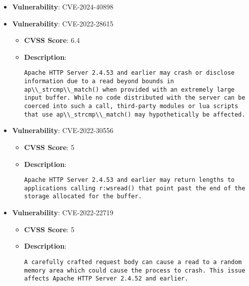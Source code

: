 \documentclass{article}
\begin{document}
\begin{itemize}
        \item \textbf{Vulnerability}: CVE-2024-40898
    
        \item \textbf{Vulnerability}: CVE-2022-28615
        \begin{itemize}
            \item \textbf{CVSS Score}:  6.4 
            \item \textbf{Description}:
            \parbox[t]{0.9\linewidth}{
                \verb|Apache HTTP Server 2.4.53 and earlier may crash or disclose information due to a read beyond bounds in ap\\_strcmp\\_match() when provided with an extremely large input buffer. While no code distributed with the server can be coerced into such a call, third-party modules or lua scripts that use ap\\_strcmp\\_match() may hypothetically be affected.|
            }
        \end{itemize}
    
        \item \textbf{Vulnerability}: CVE-2022-30556
        \begin{itemize}
            \item \textbf{CVSS Score}:  5 
            \item \textbf{Description}:
            \parbox[t]{0.9\linewidth}{
                \verb|Apache HTTP Server 2.4.53 and earlier may return lengths to applications calling r:wsread() that point past the end of the storage allocated for the buffer.|
            }
        \end{itemize}
    
        \item \textbf{Vulnerability}: CVE-2022-22719
        \begin{itemize}
            \item \textbf{CVSS Score}:  5 
            \item \textbf{Description}:
            \parbox[t]{0.9\linewidth}{
                \verb|A carefully crafted request body can cause a read to a random memory area which could cause the process to crash. This issue affects Apache HTTP Server 2.4.52 and earlier.|
            }
        \end{itemize}
    
\end{itemize}
\end{document}
